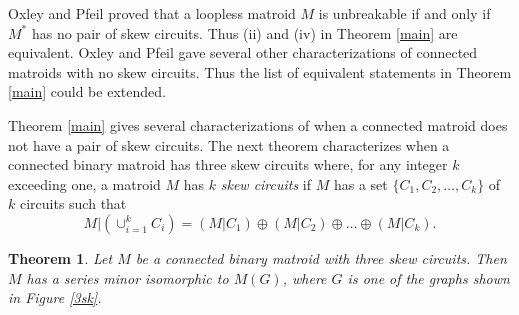 \documentclass[12pt,reqno]{amsart}
\newtheorem{theorem}{Theorem}[section]
\theoremstyle{definition}
\theoremstyle{remark}
\numberwithin{equation}{section}
\begin{document}
Oxley and Pfeil \cite[Theorem 1.1]{ub} proved that a loopless matroid $M$ is unbreakable if and only if $M^*$ has no pair of skew circuits. 
Thus (ii) and (iv) in Theorem \ref{main} are equivalent.
Oxley and Pfeil gave several other characterizations of connected matroids with no skew circuits. Thus the list of equivalent statements in Theorem \ref{main} could be extended. 

Theorem \ref{main} gives several characterizations of when a connected matroid does not have a pair of skew circuits. 
The next theorem characterizes when a connected binary matroid has three skew circuits where, for any integer $k$ exceeding one, a matroid $M$ has $k$ \textit{skew circuits} if $M$ has a set $\{C_1,C_2,\ldots,C_k\}$ of $k$ circuits  such that 
        \[
            M\big|\left(\cup_{i=1}^k C_i\right)=(M|C_1)\oplus (M|C_2)\oplus\ldots\oplus (M|C_k).
        \]

\begin{theorem}\label{3thm}
    Let $M$ be a connected binary matroid with three skew circuits. Then $M$ has a series minor isomorphic to $M(G)$, where $G$ is one of the graphs shown in Figure \ref{3sk}.  
\end{theorem}
\end{document}
